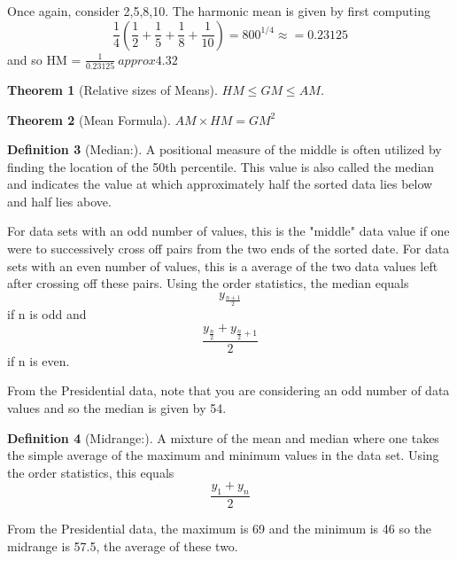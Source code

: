 \documentclass[10pt,]{book}
\theoremstyle{plain}
\newtheorem{theorem}{Theorem}[section]
\theoremstyle{definition}
\newtheorem{definition}[theorem]{Definition}
\theoremstyle{definition}
\theoremstyle{definition}
\numberwithin{equation}{section}
\begin{document}
	Once again, consider {2,5,8,10}. The harmonic mean is given by first computing
	\begin{equation*}\frac{1}{4} (\frac{1}{2} + \frac{1}{5} + \frac{1}{8} + \frac{1}{10}) = 800^{1/4} \approx = 0.23125\end{equation*}
	and so HM = \(\frac{1}{0.23125} \ approx 4.32\)
\begin{theorem}[{Relative sizes of Means}]\label{theorem-5}
\(HM \le GM \le AM\). \end{theorem}
\begin{theorem}[{Mean Formula}]\label{theorem-6}
\(AM×HM=GM^2\)\end{theorem}
\begin{definition}[{Median:}]\label{definition-10}
A positional measure of the middle is often utilized by finding the location of the 50th percentile. This value is also called the median and indicates the value at which approximately half the sorted data lies below and half lies above.%
\end{definition}
\par

For data sets with an odd number of values, this is the "middle" data value if one were to successively cross off pairs from the two ends of the sorted date. For data sets with an even number of values, this is a average of the two data values left after crossing off these pairs.  Using the order statistics, the median equals
\begin{equation*}y_{\frac{n+1}{2}}\end{equation*}
if n is odd and
\begin{equation*}\frac{y_\frac{n}{2} + y_{\frac{n}{2}+1}}{2}\end{equation*}
if n is even.
%
\par
From the Presidential data, note that you are considering an odd number of data values and so the median is given by 54. %
\begin{definition}[{Midrange:}]\label{definition-11}
A mixture of the mean and median where one takes the simple average of the maximum and minimum values in the data set. Using the order statistics, this equals 
\begin{equation*}\frac{y_1+y_n}{2}\end{equation*}
%
\end{definition}
\par
From the Presidential data, the maximum is 69 and the minimum is 46 so the midrange is 57.5, the average of these two. %
\par
\end{document}

